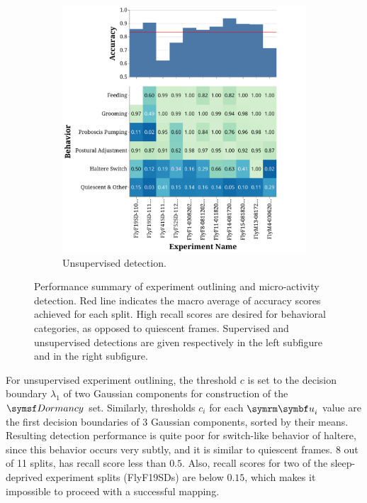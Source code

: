 \begin{figure}[thb!]
\begin{subfigure}[b]{0.495\linewidth}
		\centering\includegraphics[width=\linewidth]{figures/OutliningPerformance-Unsupervised.pdf}
		\caption{Unsupervised detection.}
	\end{subfigure}%
	\caption[Performance summary of experiment outlining and micro-activity detection.]{Performance summary of experiment outlining and micro-activity detection.
		Red line indicates the macro average of accuracy scores achieved for each split.
		High recall scores are desired for behavioral categories, as opposed to quiescent frames.
		Supervised and unsupervised detections are given respectively in the left subfigure and in the right subfigure. \label{figure:outlining-performance}}
\end{figure}

For unsupervised experiment outlining, the threshold $c$ is set to the decision boundary $\lambda_1$ of two Gaussian components for construction of the $\Dormancy$ set.
Similarly, thresholds $c_i$ for each $\V{u}_i$ value are the first decision boundaries of $3$ Gaussian components, sorted by their means.
Resulting detection performance is quite poor for switch-like behavior of haltere, since this behavior occurs very subtly, and it is similar to quiescent frames.
8 out of 11 splits, has recall score less than $0.5$.
Also, recall scores for two of the sleep-deprived experiment splits (FlyF19SDs) are below $0.15$, which makes it impossible to proceed with a successful mapping.

